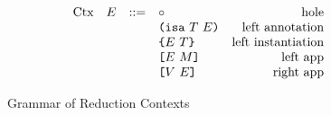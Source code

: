 \documentclass[../main.tex]{subfiles}
\begin{document}
\begin{figure*}[t]
    \centering
    \[\begin{array}{lrclr}
        \textrm{Ctx} & E & ::= & \hole{}                               & \textrm{hole}\\
                     &   &     & \inAnnLeft{E}{T}                      & \textrm{left annotation}\\
                     &   &     & \inInstLeft{E}{T}                     & \textrm{left instantiation}\\
                     &   &     & \inAppLeft{E}{M}                      & \textrm{left app}\\
                     &   &     & \inAppRight{V}{E}                     & \textrm{right app}\\
    \end{array}\]
    \caption{Grammar of Reduction Contexts}
    \label{fig:Plutus_core_reduction_contexts}
\end{figure*}
\end{document}

